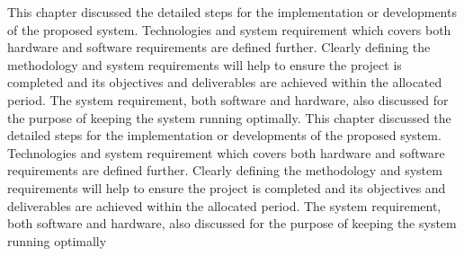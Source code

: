 \documentclass[../index.tex]{subfiles}
\begin{document}
This chapter discussed the detailed steps for the implementation or
developments of the proposed system. Technologies and system requirement which
covers both hardware and software requirements are defined further. Clearly defining
the methodology and system requirements will help to ensure the project is completed
and its objectives and deliverables are achieved within the allocated period. The
system requirement, both software and hardware, also discussed for the purpose of
keeping the system running optimally. This chapter discussed the detailed steps for the
implementation or developments of the proposed system. Technologies and system
requirement which covers both hardware and software requirements are defined
further. Clearly defining the methodology and system requirements will help to ensure
the project is completed and its objectives and deliverables are achieved within the
allocated period. The system requirement, both software and hardware, also discussed
for the purpose of keeping the system running optimally
\end{document}

